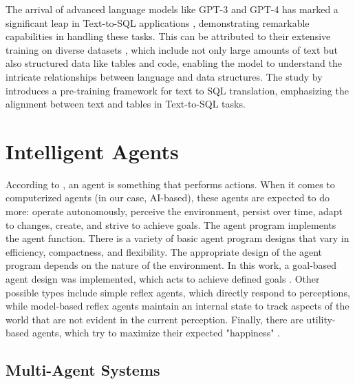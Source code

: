            The arrival of advanced language models like GPT-3 and GPT-4 \citep{OpenAImodels} has marked a significant leap in Text-to-SQL applications \citep{Singh2023}, demonstrating remarkable capabilities in handling these tasks. This can be attributed to their extensive training on diverse datasets \citep{Deng2021}, which include not only large amounts of text but also structured data like tables and code, enabling the model to understand the intricate relationships between language and data structures. The study by \citep{Deng2023} introduces a pre-training framework for text to SQL translation, emphasizing the alignment between text and tables in Text-to-SQL tasks.






    \section{Intelligent Agents}         
        According to \citet{Russell2020}, an agent is something that performs actions. When it comes to computerized agents (in our case, AI-based), these agents are expected to do more: operate autonomously, perceive the environment, persist over time, adapt to changes, create, and strive to achieve goals.
        The agent program implements the agent function.
        There is a variety of basic agent program designs that vary in efficiency, compactness, and flexibility. The appropriate design of the agent program depends on the nature of the environment. In this work, a goal-based agent design was implemented, which acts to achieve defined goals \citep{Russell2020}.
        Other possible types include simple reflex agents, which directly respond to perceptions, while model-based reflex agents maintain an internal state to track aspects of the world that are not evident in the current perception. Finally, there are utility-based agents, which try to maximize their expected "happiness" \citep{Russell2020}.


        \subsection{Multi-Agent Systems}

